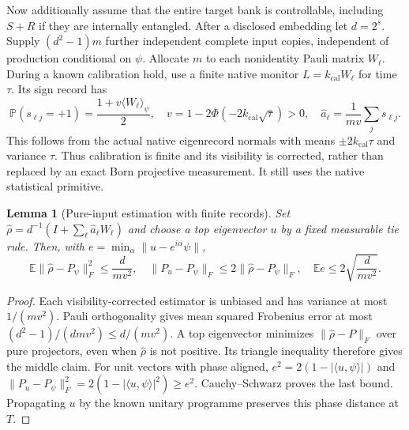 \documentclass[11pt,oneside,openany]{book}
\newtheorem{lemma}[theorem]{Lemma}
\theoremstyle{definition}
\theoremstyle{remark}\newtheorem{remark}[theorem]{Remark}
\begin{document}
Now additionally assume that the entire target bank is controllable,
including $S+R$ if they are internally entangled. After a disclosed
embedding let $d=2^s$. Supply $(d^2-1)m$ further independent complete
input copies, independent of production conditional on $\psi$.
Allocate $m$ to each nonidentity Pauli matrix $W_\ell$. During a
known calibration hold, use a finite native monitor
$L=k_{\mathrm{cal}}W_\ell$ for time $\tau$. Its sign record has
\begin{equation}
 \mathbb P(s_{\ell j}=+1)=\frac{1+v\langle W_\ell\rangle_\psi}{2},
 \quad v=1-2\Phi(-2k_{\mathrm{cal}}\sqrt\tau)>0,
 \quad\widehat a_\ell=\frac1{mv}\sum_js_{\ell j}.             \label{copy:tomography}
\end{equation}
This follows from the actual native eigenrecord normals with means
$\pm2k_{\mathrm{cal}}\tau$ and variance $\tau$. Thus calibration
is finite and its visibility is corrected, rather than replaced by an
exact Born projective measurement. It still uses the native statistical
primitive.

\begin{lemma}[Pure-input estimation with finite records]
\label{copy:tomography-error}
Set $\widehat\rho=d^{-1}(I+\sum_\ell\widehat a_\ell W_\ell)$
and choose a top eigenvector $u$ by a fixed measurable tie rule. Then,
with $e=\min_\alpha\|u-e^{i\alpha}\psi\|$,
\begin{equation}
 \mathbb E\|\widehat\rho-P_\psi\|_F^2\le\frac d{mv^2},
 \quad\|P_u-P_\psi\|_F\le2\|\widehat\rho-P_\psi\|_F,
 \quad\mathbb E e\le2\sqrt{\frac d{mv^2}}.                  \label{copy:tomo-bound}
\end{equation}
\end{lemma}
\begin{proof}
Each visibility-corrected estimator is unbiased and has variance at
most $1/(mv^2)$. Pauli orthogonality gives mean squared Frobenius
error at most $(d^2-1)/(dmv^2)\le d/(mv^2)$.
A top eigenvector minimizes $\|\widehat\rho-P\|_F$ over pure
projectors, even when $\widehat\rho$ is not positive. Its triangle
inequality therefore gives the middle claim. For unit vectors with
phase aligned, $e^2=2(1-|\langle u,\psi\rangle|)$ and
$\|P_u-P_\psi\|_F^2=2(1-|\langle u,\psi\rangle|^2)\ge e^2$.
Cauchy--Schwarz proves the last bound. Propagating $u$ by the known
unitary programme preserves this phase distance at $T$.
\end{proof}
\end{document}
